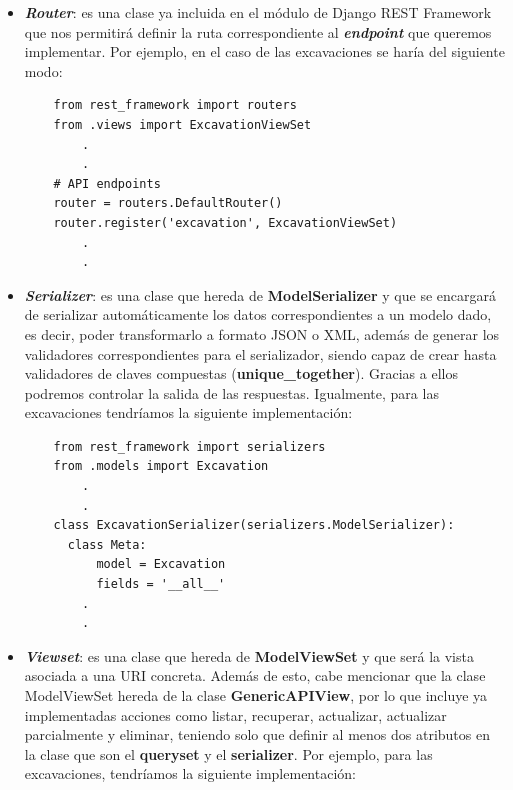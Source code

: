     \begin{itemize}
        \item \textbf{\textit{Router}}: es una clase ya incluida en el módulo de Django REST
        Framework que nos permitirá definir la ruta correspondiente al
        \textbf{\textit{endpoint}} que queremos implementar. Por ejemplo, en el caso de las
        excavaciones se haría del siguiente modo:
    
    \begin{verbatim}
    from rest_framework import routers
    from .views import ExcavationViewSet
        .
        .
    # API endpoints
    router = routers.DefaultRouter()
    router.register('excavation', ExcavationViewSet)
        .
        .
    \end{verbatim}

        \item \textbf{\textit{Serializer}}: es una clase que hereda de
        \textbf{ModelSerializer} y que se encargará de serializar automáticamente los datos
        correspondientes a un modelo dado, es decir, poder transformarlo a formato JSON o
        XML, además de generar los validadores correspondientes para el serializador, siendo
        capaz de crear hasta validadores de claves compuestas (\textbf{unique\_together}).
        Gracias a ellos podremos controlar la salida de las respuestas. Igualmente, para
        las excavaciones tendríamos la siguiente implementación:
    
    \begin{verbatim}
    from rest_framework import serializers
    from .models import Excavation
        .
        .
    class ExcavationSerializer(serializers.ModelSerializer):
      class Meta:
          model = Excavation
          fields = '__all__'
        .
        .
    \end{verbatim}

        \item \textbf{\textit{Viewset}}: es una clase que hereda de \textbf{ModelViewSet} y
        que será la vista asociada a una URI concreta. Además de esto, cabe mencionar que
        la clase ModelViewSet hereda de la clase \textbf{GenericAPIView}, por lo que
        incluye ya implementadas acciones como listar, recuperar, actualizar, actualizar
        parcialmente y eliminar, teniendo solo que definir al menos dos atributos en la
        clase que son el \textbf{queryset} y el \textbf{serializer}. Por ejemplo, para las
        excavaciones, tendríamos la siguiente implementación:
    

\end{itemize}
